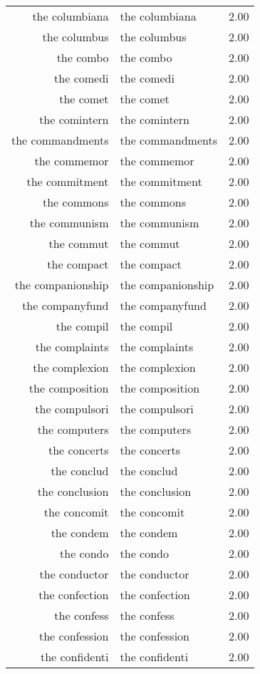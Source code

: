 \begin{table}[ht]
\begin{tabular}{rlr}
  the columbiana & the columbiana & 2.00 \\ 
  the columbus & the columbus & 2.00 \\ 
  the combo & the combo & 2.00 \\ 
  the comedi & the comedi & 2.00 \\ 
  the comet & the comet & 2.00 \\ 
  the comintern & the comintern & 2.00 \\ 
  the commandments & the commandments & 2.00 \\ 
  the commemor & the commemor & 2.00 \\ 
  the commitment & the commitment & 2.00 \\ 
  the commons & the commons & 2.00 \\ 
  the communism & the communism & 2.00 \\ 
  the commut & the commut & 2.00 \\ 
  the compact & the compact & 2.00 \\ 
  the companionship & the companionship & 2.00 \\ 
  the companyfund & the companyfund & 2.00 \\ 
  the compil & the compil & 2.00 \\ 
  the complaints & the complaints & 2.00 \\ 
  the complexion & the complexion & 2.00 \\ 
  the composition & the composition & 2.00 \\ 
  the compulsori & the compulsori & 2.00 \\ 
  the computers & the computers & 2.00 \\ 
  the concerts & the concerts & 2.00 \\ 
  the conclud & the conclud & 2.00 \\ 
  the conclusion & the conclusion & 2.00 \\ 
  the concomit & the concomit & 2.00 \\ 
  the condem & the condem & 2.00 \\ 
  the condo & the condo & 2.00 \\ 
  the conductor & the conductor & 2.00 \\ 
  the confection & the confection & 2.00 \\ 
  the confess & the confess & 2.00 \\ 
  the confession & the confession & 2.00 \\ 
  the confidenti & the confidenti & 2.00 \\ 

\end{tabular}
\end{table}
